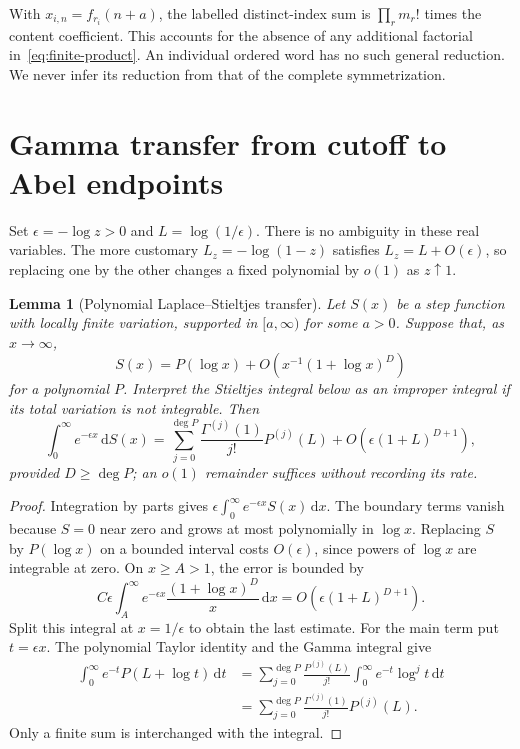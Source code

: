 \documentclass[11pt,oneside]{article}
\numberwithin{equation}{section}
\newtheorem{lemma}[theorem]{Lemma}
\theoremstyle{definition}
\theoremstyle{remark}
\newcommand{\dd}{\,\mathrm d}
\begin{document}
With $x_{i,n}=f_{r_i}(n+a)$, the labelled distinct-index sum is
$\prod_r m_r!$ times the content coefficient. This accounts for the absence
of any additional factorial in~\eqref{eq:finite-product}. An individual
ordered word has no such general reduction. We never infer its reduction
from that of the complete symmetrization.

\section{Gamma transfer from cutoff to Abel endpoints}
\label{sec:abel}

Set $\epsilon=-\log z>0$ and $L=\log(1/\epsilon)$. There is no ambiguity in
these real variables. The more customary $L_z=-\log(1-z)$ satisfies
$L_z=L+O(\epsilon)$, so replacing one by the other changes a fixed polynomial
by $o(1)$ as $z\uparrow1$.

\begin{lemma}[Polynomial Laplace--Stieltjes transfer]\label{lem:laplace}
Let $S(x)$ be a step function with locally finite variation, supported in
$[a,\infty)$ for some $a>0$. Suppose that, as $x\to\infty$,
\[
S(x)=P(\log x)+O(x^{-1}(1+\log x)^D)
\]
for a polynomial $P$. Interpret the Stieltjes integral below as an improper
integral if its total variation is not integrable. Then
\begin{equation}\label{eq:laplace}
\int_0^\infty e^{-\epsilon x}\dd S(x)
=\sum_{j=0}^{\deg P}\frac{\Gamma^{(j)}(1)}{j!}P^{(j)}(L)
 +O\!\left(\epsilon(1+L)^{D+1}\right),
\end{equation}
provided $D\ge\deg P$; an $o(1)$ remainder suffices without recording its rate.
\end{lemma}

\begin{proof}
Integration by parts gives $\epsilon\int_0^\infty e^{-\epsilon x}S(x)\dd x$.
The boundary terms vanish because $S=0$ near zero and grows at most
polynomially in $\log x$. Replacing $S$ by $P(\log x)$ on a bounded interval
costs $O(\epsilon)$, since powers of $\log x$ are integrable at zero. On
$x\ge A>1$, the error is bounded by
\[
C\epsilon\int_A^\infty e^{-\epsilon x}
 \frac{(1+\log x)^D}{x}\dd x
=O(\epsilon(1+L)^{D+1}).
\]
Split this integral at $x=1/\epsilon$ to obtain the last estimate.
For the main term put $t=\epsilon x$. The polynomial Taylor identity and the
Gamma integral give
\begin{align*}
\int_0^\infty e^{-t}P(L+\log t)\dd t
 &=\sum_{j=0}^{\deg P}\frac{P^{(j)}(L)}{j!}
     \int_0^\infty e^{-t}\log^j t\dd t\\
 &=\sum_{j=0}^{\deg P}\frac{\Gamma^{(j)}(1)}{j!}P^{(j)}(L).
\end{align*}
Only a finite sum is interchanged with the integral.
\end{proof}
\end{document}
